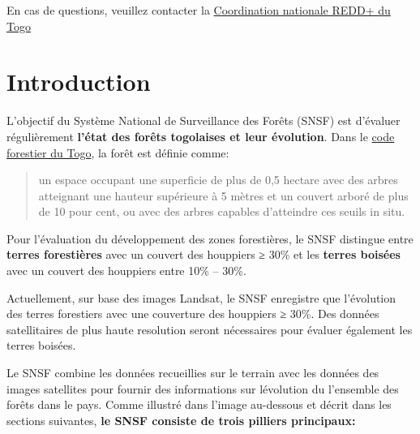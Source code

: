 \documentclass[a4paper, notitlepage, 12pt, krantz2]{krantz}
\makeatletter
\newenvironment{kframe}{%
\medskip{}
\setlength{\fboxsep}{.8em}
 \def\at@end@of@kframe{}%
 \ifinner\ifhmode%
  \def\at@end@of@kframe{\end{minipage}}%
  \begin{minipage}{\columnwidth}%
 \fi\fi%
 \def\FrameCommand##1{\hskip\@totalleftmargin \hskip-\fboxsep
 \colorbox{shadecolor}{##1}\hskip-\fboxsep
     \hskip-\linewidth \hskip-\@totalleftmargin \hskip\columnwidth}%
 \MakeFramed {\advance\hsize-\width
   \@totalleftmargin\z@ \linewidth\hsize
   \@setminipage}}%
 {\par\unskip\endMakeFramed%
 \at@end@of@kframe}
\newenvironment{rmdblock}[1]
  {
  \begin{itemize}
  \renewcommand{\labelitemi}{
    \raisebox{-.7\height}[0pt][0pt]{
      {\setkeys{Gin}{width=3em,keepaspectratio}\texttt{[image: images/icons/\#1]}}
    }
  }
  \setlength{\fboxsep}{1em}
  \begin{kframe}
  \item
  }
  {
  \end{kframe}
  \end{itemize}
  }
\newenvironment{rmdtodo}
  {\begin{rmdblock}{todo}}
  {\end{rmdblock}}
\makeatother
\begin{document}
En cas de questions, veuillez contacter la \href{http://www.reddtogo.tg/index.php/contacts}{Coordination nationale REDD+ du Togo}

\hypertarget{introduction}{%
\section{Introduction}\label{introduction}}

L'objectif du Système National de Surveillance des Forêts (SNSF) est d'évaluer régulièrement \textbf{l'état des forêts togolaises et leur évolution}. Dans le \href{http://faolex.fao.org/docs/pdf/tog85011.pdf}{code forestier du Togo}, la forêt est définie comme:

\begin{quote}
un espace occupant une superficie de plus de 0,5 hectare avec des arbres atteignant une hauteur supérieure à 5 mètres et un couvert arboré de plus de 10 pour cent, ou avec des arbres capables d'atteindre ces seuils in situ.
\end{quote}

Pour l'évaluation du développement des zones forestières, le SNSF distingue entre \textbf{terres forestières} avec un couvert des houppiers ≥ 30\% et les \textbf{terres boisées} avec un couvert des houppiers entre 10\% -- 30\%.

\begin{rmdtodo}
Actuellement, sur base des images Landsat, le SNSF enregistre que
l'évolution des terres forestiers avec une couverture des houppiers ≥
30\%. Des données satellitaires de plus haute resolution seront
nécessaires pour évaluer également les terres boisées.
\end{rmdtodo}

Le SNSF combine les données recueillies sur le terrain avec les données des images satellites pour fournir des informations sur lévolution du l'ensemble des forêts dans le pays. Comme illustré dans l'image au-dessous et décrit dans les sections suivantes, \textbf{le SNSF consiste de trois pilliers principaux:}
\end{document}
